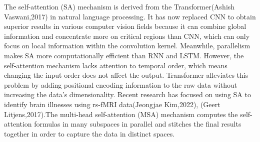 \documentclass[a4paper]{cas-dc}
\begin{document}
The self-attention (SA) mechanism is derived from the Transformer(Ashish Vaswani,2017) in natural language processing. It has now replaced CNN to obtain superior results in various computer vision fields because it can combine global information and concentrate more on critical regions than CNN, which can only focus on local information within the convolution kernel. Meanwhile, parallelism makes SA more computationally efficient than RNN and LSTM. However, the self-attention mechanism lacks attention to temporal order, which means changing the input order does not affect the output. Transformer alleviates this problem by adding positional encoding information to the raw data without increasing the data's dimensionality. Recent research has focused on using SA to identify brain illnesses using rs-fMRI data(Jeongjae Kim,2022), (Geert Litjens,2017).The multi-head self-attention (MSA) mechanism computes the self-attention formulas in many subspaces in parallel and stitches the final results together in order to capture the data in distinct spaces.
\end{document}
